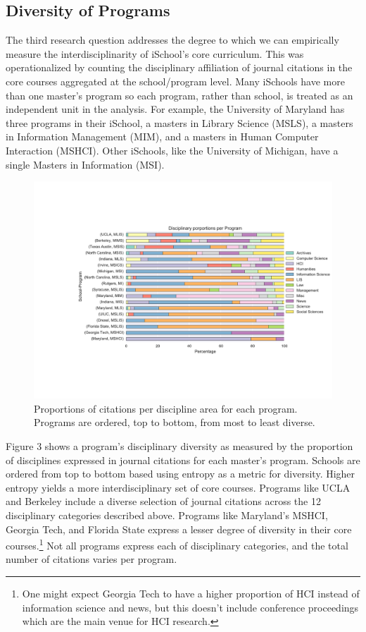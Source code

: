 \documentclass[10pt, letterpaper]{article}
\begin{document}
\subsection{Diversity of Programs}
The third research question addresses the degree to which we can empirically measure the interdisciplinarity of iSchool's core curriculum. This was operationalized by counting the disciplinary affiliation of journal citations in the core courses aggregated at the school/program level. Many iSchools have more than one master's program so each program, rather than school, is treated as an independent unit in the analysis. For example, the University of Maryland has three programs in their iSchool, a masters in Library Science (MSLS), a masters in Information Management (MIM), and a masters in Human Computer Interaction (MSHCI). Other iSchools, like the University of Michigan, have a single Masters in Information (MSI).

\begin{figure}[h]
\includegraphics[width=\textwidth]{proportion_per_program.pdf} 
\caption{Proportions of citations per discipline area for each program. Programs are ordered, top to bottom, from most to least diverse.} 
\end{figure}

Figure 3 shows a program's disciplinary diversity as measured by the proportion of disciplines expressed in journal citations for each master's program. Schools are ordered from top to bottom based using entropy as a metric for diversity. Higher entropy yields a more interdisciplinary set of core courses. Programs like UCLA and Berkeley include a diverse selection of journal citations across the 12 disciplinary categories described above. Programs like Maryland's MSHCI, Georgia Tech, and Florida State express a lesser degree of diversity in their core courses.\footnote{One might expect Georgia Tech to have a higher proportion of HCI instead of information science and news, but this doesn't include conference proceedings which are the main venue for HCI research.} Not all programs express each of disciplinary categories, and the total number of citations varies per program.
\end{document}
